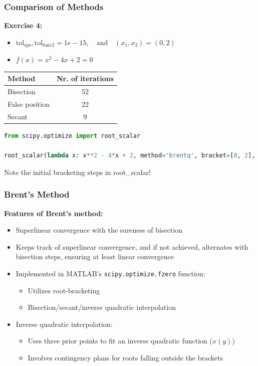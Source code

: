 \begin{frame}[fragile]
  \frametitle{Comparison of Methods}

  \textbf{Exercise 4:}
  \begin{itemize}
    \item \( \text{tol}_{\text{eps}}, \text{tol}_{\text{func2}} = 1e-15, \quad \text{and} \quad (x_1, x_2) = (0,2) \)
    \item \( f(x) = x^2 - 4x + 2 = 0 \)
  \end{itemize}

  \begin{table}
      \begin{tabular}{|l|c|}
          \hline
          Method & Nr. of iterations \\
          \hline
          Bisection & 52 \\
          False position & 22 \\
          Secant & 9 \\
          \hline
      \end{tabular}
  \end{table}

  \begin{lstlisting}[language=Python, basicstyle=\small]
from scipy.optimize import root_scalar

root_scalar(lambda x: x**2 - 4*x + 2, method='brentq', bracket=[0, 2], xtol=1e-15)
  \end{lstlisting}
  
  Note the initial bracketing steps in root\_scalar!
\end{frame}


\begin{frame}[fragile]
    \frametitle{Brent's Method}

    \textbf{Features of Brent's method:}
    \begin{itemize}
        \item Superlinear convergence with the sureness of bisection
        \item Keeps track of superlinear convergence, and if not achieved, alternates with bisection steps, ensuring at least linear convergence
        \item Implemented in MATLAB's \texttt{scipy.optimize.fzero} function:
        \begin{itemize}
            \item Utilizes root-bracketing
            \item Bisection/secant/inverse quadratic interpolation
        \end{itemize}
        \item Inverse quadratic interpolation:
        \begin{itemize}
            \item Uses three prior points to fit an inverse quadratic function ($x(y)$)
            \item Involves contingency plans for roots falling outside the brackets
        \end{itemize}
    \end{itemize}

\end{frame}

